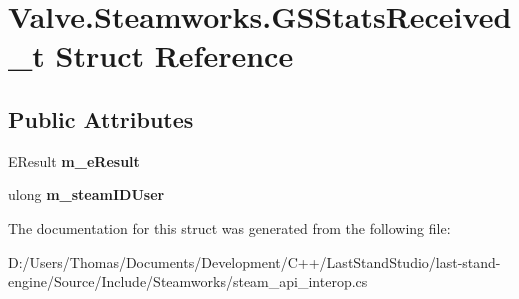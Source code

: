 \hypertarget{structValve_1_1Steamworks_1_1GSStatsReceived__t}{}\section{Valve.\+Steamworks.\+G\+S\+Stats\+Received\+\_\+t Struct Reference}
\label{structValve_1_1Steamworks_1_1GSStatsReceived__t}
\subsection*{Public Attributes}
\begin{DoxyCompactItemize}
\item 
\hypertarget{structValve_1_1Steamworks_1_1GSStatsReceived__t_a05c346e7ae8af0dbb851d61a61b4e88d}{}E\+Result {\bfseries m\+\_\+e\+Result}\label{structValve_1_1Steamworks_1_1GSStatsReceived__t_a05c346e7ae8af0dbb851d61a61b4e88d}

\item 
\hypertarget{structValve_1_1Steamworks_1_1GSStatsReceived__t_a0490ece5f004097a62258b1ab01f6323}{}ulong {\bfseries m\+\_\+steam\+I\+D\+User}\label{structValve_1_1Steamworks_1_1GSStatsReceived__t_a0490ece5f004097a62258b1ab01f6323}

\end{DoxyCompactItemize}


The documentation for this struct was generated from the following file\+:\begin{DoxyCompactItemize}
\item 
D\+:/\+Users/\+Thomas/\+Documents/\+Development/\+C++/\+Last\+Stand\+Studio/last-\/stand-\/engine/\+Source/\+Include/\+Steamworks/steam\+\_\+api\+\_\+interop.\+cs\end{DoxyCompactItemize}
